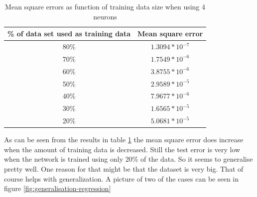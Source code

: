 \documentclass[a4paper]{article}
\begin{document}
\begin{table}
\begin{center}
    \begin{tabular}{|c|c|}
        \hline
         \% of data set used as training data & Mean square error \\
         \hline
         80\% & $1.3094*10^{-7}$\\
         \hline 
         70\% & $1.7549*10^{-6}$\\
         \hline
         60\% & $3.8755*10^{-6}$\\
         \hline
         50\% & $2.9589*10^{-5}$\\
         \hline
         40\% & $7.9677*10^{-6}$\\
         \hline
         30\% & $1.6565*10^{-5}$\\
         \hline
         20\% & $5.0681*10^{-5}$\\
         \hline
    \end{tabular}
    \caption{Mean square errors as function of training data size when using 4 neurons}
    \label{table:mse-training-data}
    \end{center}
\end{table}

As can be seen from the results in table \ref{table:mse-training-data} the mean square error does increase when the amount of training data is decreased. Still the test error is very low when the network is trained using only 20\% of the data. So it seems to generalise pretty well. One reason for that might be that the dataset is very big. That of course helps with generalization. A picture of two of the cases can be seen in figure \ref{fig:generalisation-regression}
\end{document}
